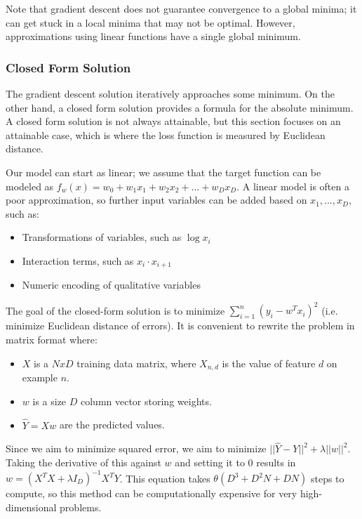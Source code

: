 \documentclass[12pt,titlepage]{article}
\begin{document}
      Note that gradient descent does not guarantee convergence to a global minima; it can get stuck in a local minima that may not be optimal. However, approximations using
      linear functions have a single global minimum.

      \subsubsection{Closed Form Solution}
        The gradient descent solution iteratively approaches some minimum. On the other hand, a closed form solution provides a formula for the absolute minimum. A closed form
        solution is not always attainable, but this section focuses on an attainable case, which is where the loss function is measured by Euclidean distance.

        Our model can start as linear; we assume that the target function can be modeled as $f_w(x) = w_0 + w_1x_1 + w_2x_2 + ... + w_Dx_D$. A linear model is often a poor
        approximation, so further input variables can be added based on $x_1, ..., x_D$, such as:
        \begin{itemize}
          \item Transformations of variables, such as $\log{x_i}$
          \item Interaction terms, such as $x_i \cdot x_{i+1}$
          \item Numeric encoding of qualitative variables
        \end{itemize}

        The goal of the closed-form solution is to minimize $\sum_{i=1}^n (y_i - w^Tx_i)^2$ (i.e. minimize Euclidean distance of errors). It is convenient to rewrite the
        problem in matrix format where:
        \begin{itemize}
          \item $X$ is a $NxD$ training data matrix, where $X_{n,d}$ is the value of feature $d$ on example $n$.
          \item $w$ is a size $D$ column vector storing weights.
          \item $\hat{Y} = Xw$ are the predicted values.
        \end{itemize}

        Since we aim to minimize squared error, we aim to minimize $|| \hat{Y} - Y ||^2 + \lambda||w||^2$. Taking the derivative of this against $w$ and setting it to 0
        results in $w = (X^TX + \lambda I_D)^{-1}X^TY$. This equation takes $\theta(D^3 + D^2N + DN)$ steps to compute, so this method can be computationally expensive
        for very high-dimensional problems.
\end{document}
